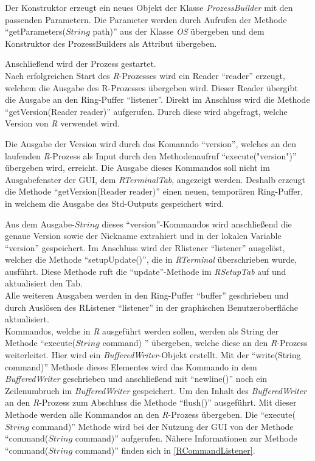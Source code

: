\documentclass[a4paper, 12pt]{report} %
\begin{document}
Der Konstruktor erzeugt ein neues Objekt der Klasse \textit{ProzessBuilder} mit den passenden Parametern. Die Parameter werden durch Aufrufen der Methode "`getParameters($String$ path)"' aus der Klasse \textit{OS} übergeben und dem Konstruktor des ProzessBuilders als Attribut übergeben.

Anschließend wird der Prozess gestartet.\\

Nach erfolgreichen Start des \textit{R}-Prozesses wird ein Reader "`reader"' erzeugt, welchem die Ausgabe des R-Prozesses übergeben wird. Dieser Reader übergibt die Ausgabe an den Ring-Puffer "`listener"'.
Direkt im Anschluss wird die Methode "`getVersion(Reader reader)"' aufgerufen. Durch diese wird abgefragt, welche Version von \textit{R} verwendet wird.

Die Ausgabe der Version wird durch das Komanndo "`version"', welches an den laufenden \textit{R}-Prozess als Input durch den Methodenaufruf "`execute("version")"' übergeben wird, erreicht. Die Ausgabe dieses Kommandos soll nicht im Ausgabefenster der GUI, dem \textit{RTerminalTab}, angezeigt werden. Deshalb erzeugt die Methode "`getVersion(Reader reader)"' einen neuen, temporären Ring-Puffer, in welchem die Ausgabe des Std-Outputs gespeichert wird. 

Aus dem Ausgabe-$String$ dieses "`version"'-Kommandos wird anschließend die genaue Version sowie der Nickname extrahiert und in der lokalen Variable "`version"' gespeichert. Im Anschluss wird der Rlistener  "`listener"' ausgelöst, welcher die Methode "`setupUpdate()"', die in \textit{RTerminal} überschrieben wurde, ausführt. Diese Methode ruft die "`update"'-Methode im \textit{RSetupTab} auf und aktualisiert den Tab.\\

Alle weiteren Ausgaben werden in den Ring-Puffer "`buffer"' geschrieben und durch Auslösen des RListener "`listener"' in der graphischen Benutzeroberfläche aktualisiert.\\

Kommandos, welche in \textit{R} ausgeführt werden sollen, werden als String der Methode "`execute($String$ command) "' übergeben, welche diese an den \textit{R}-Prozess weiterleitet. Hier wird ein \textit{BufferedWriter}-Objekt erstellt. Mit der "`write(String command)"' Methode dieses Elementes wird das Kommando in dem \textit{BufferedWriter} geschrieben und anschließend mit "`newline()"' noch ein Zeilenumbruch im \textit{BufferedWriter} gespeichert. Um den Inhalt des \textit{BufferedWriter} an den \textit{R}-Prozess zum Abschluss die Methode "`flush()"' ausgeführt.
Mit dieser Methode werden alle Kommandos an den \textit{R}-Prozess übergeben. Die "`execute($String$ command)"' Methode wird bei der Nutzung der GUI von der Methode "`command($String$ command)"' aufgerufen. Nähere Informationen zur Methode "`command($String$ command)"' finden sich in \ref{RCommandListener}.
\end{document}
